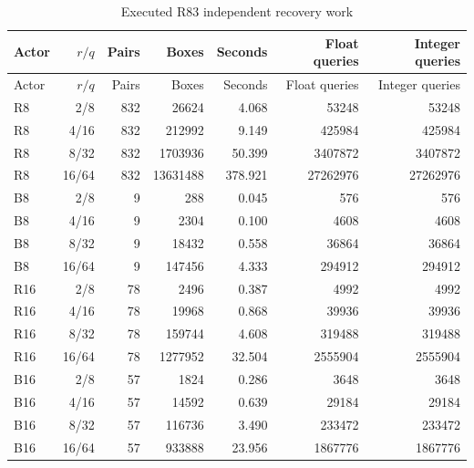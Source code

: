 {\footnotesize\setlength{\tabcolsep}{3pt}
\begin{longtable}{lrrrrrr}
\caption{Executed R83 independent recovery work}\label{tab:work82}\\
\hline
Actor & $r/q$ & Pairs & Boxes & Seconds & Float queries & Integer queries \\
\hline
\endfirsthead
\hline
Actor & $r/q$ & Pairs & Boxes & Seconds & Float queries & Integer queries \\
\hline
\endhead
R8 & 2/8 & 832 & 26624 & 4.068 & 53248 & 53248 \\
R8 & 4/16 & 832 & 212992 & 9.149 & 425984 & 425984 \\
R8 & 8/32 & 832 & 1703936 & 50.399 & 3407872 & 3407872 \\
R8 & 16/64 & 832 & 13631488 & 378.921 & 27262976 & 27262976 \\
B8 & 2/8 & 9 & 288 & 0.045 & 576 & 576 \\
B8 & 4/16 & 9 & 2304 & 0.100 & 4608 & 4608 \\
B8 & 8/32 & 9 & 18432 & 0.558 & 36864 & 36864 \\
B8 & 16/64 & 9 & 147456 & 4.333 & 294912 & 294912 \\
R16 & 2/8 & 78 & 2496 & 0.387 & 4992 & 4992 \\
R16 & 4/16 & 78 & 19968 & 0.868 & 39936 & 39936 \\
R16 & 8/32 & 78 & 159744 & 4.608 & 319488 & 319488 \\
R16 & 16/64 & 78 & 1277952 & 32.504 & 2555904 & 2555904 \\
B16 & 2/8 & 57 & 1824 & 0.286 & 3648 & 3648 \\
B16 & 4/16 & 57 & 14592 & 0.639 & 29184 & 29184 \\
B16 & 8/32 & 57 & 116736 & 3.490 & 233472 & 233472 \\
B16 & 16/64 & 57 & 933888 & 23.956 & 1867776 & 1867776 \\
\hline\end{longtable}}
